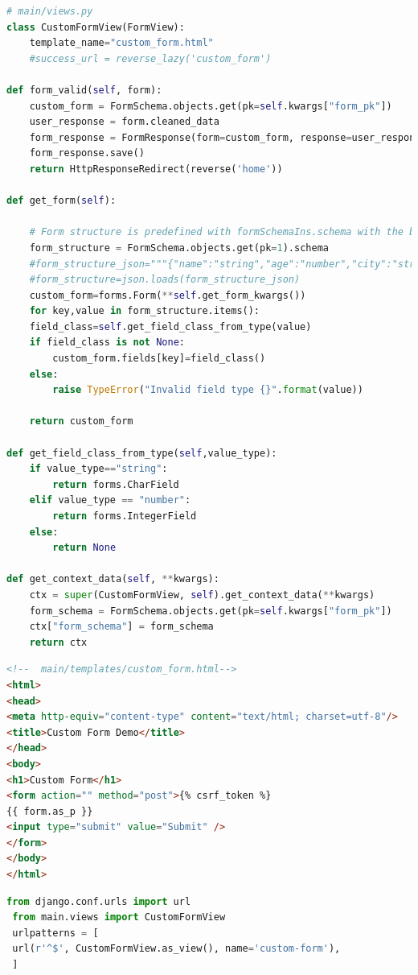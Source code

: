 \begin{lstlisting}[language=python,numbers=none]
# main/views.py
class CustomFormView(FormView):
	template_name="custom_form.html"
	#success_url = reverse_lazy('custom_form')

def form_valid(self, form):
	custom_form = FormSchema.objects.get(pk=self.kwargs["form_pk"])
	user_response = form.cleaned_data
	form_response = FormResponse(form=custom_form, response=user_response)
	form_response.save()
	return HttpResponseRedirect(reverse('home'))

def get_form(self):

	# Form structure is predefined with formSchemaIns.schema with the below given json and have done formSchemaIns.save() to load the DB schema
	form_structure = FormSchema.objects.get(pk=1).schema
	#form_structure_json="""{"name":"string","age":"number","city":"string","country":"string","time_lived_in_current_city":"string"}"""
	#form_structure=json.loads(form_structure_json)
	custom_form=forms.Form(**self.get_form_kwargs())
	for key,value in form_structure.items():
	field_class=self.get_field_class_from_type(value)
	if field_class is not None:
		custom_form.fields[key]=field_class()
	else:
		raise TypeError("Invalid field type {}".format(value))

	return custom_form

def get_field_class_from_type(self,value_type):
	if value_type=="string":
		return forms.CharField
	elif value_type == "number":
		return forms.IntegerField
	else:
		return None

def get_context_data(self, **kwargs):
	ctx = super(CustomFormView, self).get_context_data(**kwargs)
	form_schema = FormSchema.objects.get(pk=self.kwargs["form_pk"])
	ctx["form_schema"] = form_schema
	return ctx


\end{lstlisting}
\newpage
\begin{lstlisting}[language=html,numbers=none]
<!--  main/templates/custom_form.html-->
<html>
<head>
<meta http-equiv="content-type" content="text/html; charset=utf-8"/>
<title>Custom Form Demo</title>
</head>
<body>
<h1>Custom Form</h1>
<form action="" method="post">{% csrf_token %}
{{ form.as_p }}
<input type="submit" value="Submit" />
</form>
</body>
</html>
\end{lstlisting}

\begin{lstlisting}[language=python,numbers=none]
 from django.conf.urls import url
 from main.views import CustomFormView
 urlpatterns = [
 url(r'^$', CustomFormView.as_view(), name='custom-form'),
 ]
\end{lstlisting}

